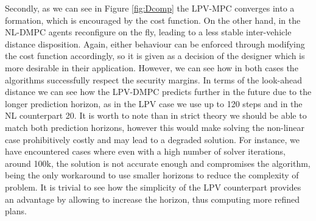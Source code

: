 \documentclass[a4paper,fleqn]{cas-sc}
\begin{document}
Secondly, as we can see in Figure \ref{fig:Dcomp} the LPV-MPC converges into a formation, which is encouraged by the cost function. On the other hand, in the NL-DMPC agents reconfigure on the fly, leading to a less stable inter-vehicle distance disposition. Again, either behaviour can be enforced through modifying the cost function accordingly, so it is given as a decision of the designer which is more desirable in their application. However, we can see how in both cases the algorithms successfully respect the security margins. In terms of the look-ahead distance we can see how the LPV-DMPC predicts further in the future due to the longer prediction horizon, as in the LPV case we use up to 120 steps and in the NL counterpart 20. It is worth to note than in strict theory we should be able to match both prediction horizons, however this would make solving the non-linear case prohibitively costly and may lead to a degraded solution. For instance, we have encountered cases where even with a high number of solver iterations, around 100k, the solution is not accurate enough and compromises the algorithm, being the only workaround to use smaller horizons to reduce the complexity of problem. It is trivial to see how the simplicity of the LPV counterpart provides an advantage by allowing to increase the horizon, thus computing more refined plans. \\ 
\end{document}
